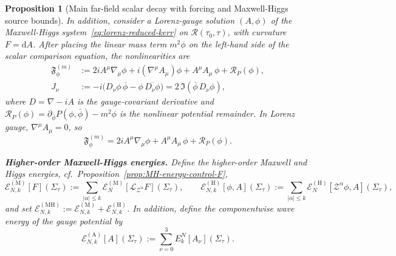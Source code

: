 \documentclass[11pt]{article}
\numberwithin{equation}{section}
\theoremstyle{plain}
\newtheorem{proposition}[theorem]{Proposition}
\theoremstyle{definition}
\theoremstyle{remark}
\newcommand{\dd}{\mathrm{d}}
\begin{document}
\begin{proposition}[Main far-field scalar decay with forcing and Maxwell-Higgs source bounds]
In addition, consider a Lorenz-gauge solution $(A,\phi)$ of the Maxwell-Higgs system~\eqref{eq:lorenz-reduced-kerr} on $\mathcal R(\tau_{0},\tau)$, with curvature $F=\dd A$. After placing the linear mass term $m^{2}\phi$ on the left-hand side of the scalar comparison equation, the nonlinearities are
\begin{eqnarray}
\mathfrak{F}_{\phi}^{(m)}
&:= 2iA^\mu\nabla_\mu\phi+ i(\nabla^\mu A_\mu)\phi +A^\mu A_\mu\,\phi +\mathcal R_{P}(\phi),
\label{eq:def-Fphi}\\
J_{\nu}
&:= -i\bigl(D_{\nu}\phi\,\overline\phi-\phi\,\overline{D_{\nu}\phi}\bigr)
=2\,\Im(\overline\phi\,D_{\nu}\phi),
\label{eq:def-J}
\end{eqnarray}
where $D=\nabla-iA$ is the gauge-covariant derivative and $\mathcal R_P(\phi)=\partial_{\bar\phi}P(\phi,\bar\phi)-m^2\phi$ is the nonlinear potential remainder.
In Lorenz gauge, $\nabla^\mu A_\mu=0$, so
\begin{equation}
\mathfrak{F}_{\phi}^{(m)}=2iA^\mu\nabla_\mu\phi+A^\mu A_\mu\,\phi+\mathcal R_P(\phi).
\end{equation}

\smallskip
\noindent
\textbf{Higher-order Maxwell-Higgs energies.}
Define the higher-order Maxwell and Higgs energies, cf.\ Proposition~\ref{prop:MH-energy-control-F},
\begin{equation}
\mathcal E_{N,k}^{(\mathrm M)}[F](\Sigma_{\tau})
:=\sum_{|\alpha|\le k}\mathcal E_{N}^{(\mathrm M)}[\mathcal L_{\mathcal Z^{\alpha}}F](\Sigma_{\tau}),
\qquad
\mathcal E_{N,k}^{(\mathrm H)}[\phi,A](\Sigma_{\tau})
:=\sum_{|\alpha|\le k}\mathcal E_{N}^{(\mathrm H)}[\mathcal Z^{\alpha}\phi,A](\Sigma_{\tau}),
\end{equation}
and set $\mathcal E_{N,k}^{(\mathrm{MH})}:=\mathcal E_{N,k}^{(\mathrm M)}+\mathcal E_{N,k}^{(\mathrm H)}$.
In addition, define the componentwise wave energy of the gauge potential by
\begin{equation}\label{eq:def-kerr-pot-energy}
\mathcal E_{N,k}^{(\mathrm A)}[A](\Sigma_{\tau})
:=
\sum_{\nu=0}^{3}E^{N}_{k}[A_{\nu}](\Sigma_{\tau}).
\end{equation}


\end{proposition}
\end{document}

